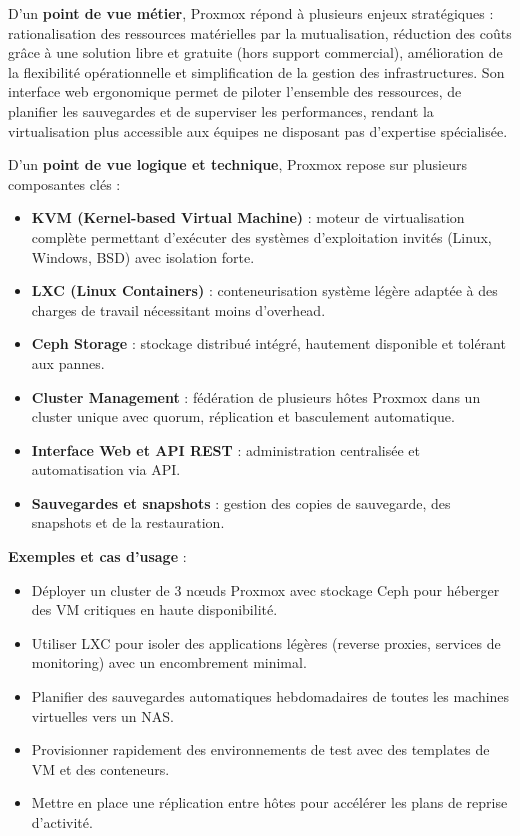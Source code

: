 D’un \textbf{point de vue métier}, Proxmox répond à plusieurs enjeux stratégiques  : rationalisation des ressources matérielles par la mutualisation, réduction des coûts grâce à une solution libre et gratuite (hors support commercial), amélioration de la flexibilité opérationnelle et simplification de la gestion des infrastructures. Son interface web ergonomique permet de piloter l’ensemble des ressources, de planifier les sauvegardes et de superviser les performances, rendant la virtualisation plus accessible aux équipes ne disposant pas d’expertise spécialisée.

D’un \textbf{point de vue logique et technique}, Proxmox repose sur plusieurs composantes clés :
\begin{itemize}
	\item \textbf{KVM (Kernel-based Virtual Machine)}  : moteur de virtualisation complète permettant d’exécuter des systèmes d’exploitation invités (Linux, Windows, BSD) avec isolation forte.
	\item \textbf{LXC (Linux Containers)}  : conteneurisation système légère adaptée à des charges de travail nécessitant moins d’overhead.
	\item \textbf{Ceph Storage}  : stockage distribué intégré, hautement disponible et tolérant aux pannes.
	\item \textbf{Cluster Management}  : fédération de plusieurs hôtes Proxmox dans un cluster unique avec quorum, réplication et basculement automatique.
	\item \textbf{Interface Web et API REST}  : administration centralisée et automatisation via API.
	\item \textbf{Sauvegardes et snapshots}  : gestion des copies de sauvegarde, des snapshots et de la restauration.
\end{itemize}

\textbf{Exemples et cas d’usage} :
\begin{itemize}
	\item Déployer un cluster de 3 nœuds Proxmox avec stockage Ceph pour héberger des VM critiques en haute disponibilité.
	\item Utiliser LXC pour isoler des applications légères (reverse proxies, services de monitoring) avec un encombrement minimal.
	\item Planifier des sauvegardes automatiques hebdomadaires de toutes les machines virtuelles vers un NAS.
	\item Provisionner rapidement des environnements de test avec des templates de VM et des conteneurs.
	\item Mettre en place une réplication entre hôtes pour accélérer les plans de reprise d’activité.
\end{itemize}

